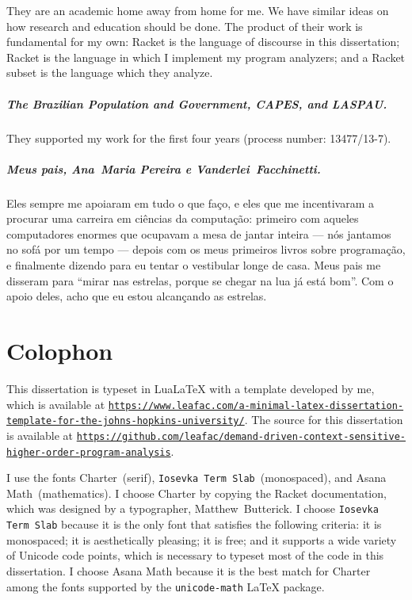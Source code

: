 \documentclass[12pt, oneside]{book}
\begin{document}
They are an academic home away from home for me. We have similar ideas on how research and education should be done. The product of their work is fundamental for my own: Racket is the language of discourse in this dissertation; Racket is the language in which I implement my program analyzers; and a Racket subset is the language which they analyze.

\paragraph{The Brazilian Population and Government, CAPES, and LASPAU.}

They supported my work for the first four years (process number: 13477/13-7).

\paragraph{Meus pais, Ana~Maria Pereira e Vanderlei~Facchinetti.}

Eles sempre me apoiaram em tudo o que faço, e eles que me incentivaram a procurar uma carreira em ciências da computação: primeiro com aqueles computadores enormes que ocupavam a mesa de jantar inteira — nós jantamos no sofá por um tempo — depois com os meus primeiros livros sobre programação, e finalmente dizendo para eu tentar o vestibular longe de casa. Meus pais me disseram para “mirar nas estrelas, porque se chegar na lua já está bom”. Com o apoio deles, acho que eu estou alcançando as estrelas.

\chapter{Colophon}

This dissertation is typeset in Lua\LaTeX{} with a template developed by me, which is available at \href{https://www.leafac.com/a-minimal-latex-dissertation-template-for-the-johns-hopkins-university/}{\texttt{https://www.leafac.com/a-minimal-latex-dissertation-template-for-the-johns-hopkins-university/}}. The source for this dissertation is available at \href{https://github.com/leafac/demand-driven-context-sensitive-higher-order-program-analysis}{\texttt{https://github.com/leafac/demand-driven-context-sensitive-higher-order-program-analysis}}.

I use the fonts Charter~(serif), \texttt{Iosevka Term Slab}~(monospaced), and Asana Math~(mathematics). I choose Charter by copying the Racket documentation, which was designed by a typographer, Matthew~Butterick. I choose \texttt{Iosevka Term Slab} because it is the only font that satisfies the following criteria: it is monospaced; it is aesthetically pleasing; it is free; and it supports a wide variety of Unicode code points, which is necessary to typeset most of the code in this dissertation. I choose Asana Math because it is the best match for Charter among the fonts supported by the \texttt{unicode-math} \LaTeX{} package.
\end{document}
